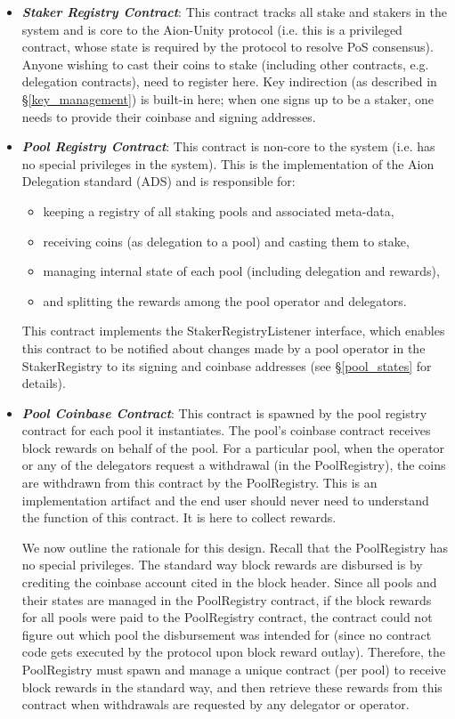 \begin{itemize}
    \item \textbf{\textit{Staker Registry Contract}}: This contract tracks all stake and stakers in the system and is core to the Aion-Unity protocol (i.e. this is a privileged contract, whose state is required by the protocol to resolve PoS consensus). Anyone wishing to cast their coins to stake (including other contracts, e.g. delegation contracts), need to register here. Key indirection (as described in \S\ref{key_management}) is built-in here; when one signs up to be a staker, one needs to provide their coinbase and signing addresses. 
    \item \textbf{\textit{Pool Registry Contract}}: This contract is non-core to the system (i.e. has no special privileges in the system). This is the implementation of the Aion Delegation standard (ADS) and is responsible for: 
    \begin{itemize}[label=--,nosep]
        \item keeping a registry of all staking pools and associated meta-data,
        \item receiving coins (as delegation to a pool) and casting them to stake, 
        \item managing internal state of each pool (including delegation and rewards),
        \item and splitting the rewards among the pool operator and delegators. 
    \end{itemize}
    This contract implements the StakerRegistryListener interface, which enables this contract to be notified about changes made by a pool operator in the StakerRegistry to its signing and coinbase addresses (see \S\ref{pool_states} for details). 
    \item \textbf{\textit{Pool Coinbase Contract}}: This contract is spawned by the pool registry contract for each pool it instantiates. The pool's coinbase contract receives block rewards on behalf of the pool. For a particular pool, when the operator or any of the delegators request a withdrawal (in the PoolRegistry), the coins are withdrawn from this contract by the PoolRegistry. This is an implementation artifact and the end user should never need to understand the function of this contract. It is here to collect rewards. 
    
    We now outline the rationale for this design. Recall that the PoolRegistry has no special privileges. The standard way block rewards are disbursed is by crediting the coinbase account cited in the block header. Since all pools and their states are managed in the PoolRegistry contract, if the block rewards for all pools were paid to the PoolRegistry contract, the contract could not figure out which pool the disbursement was intended for (since no contract code gets executed by the protocol upon block reward outlay). Therefore, the PoolRegistry must spawn and manage a unique contract (per pool) to receive block rewards in the standard way, and then retrieve these rewards from this contract when withdrawals are requested by any delegator or operator.  
\end{itemize}

